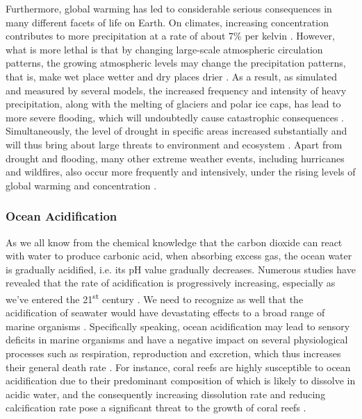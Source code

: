 \documentclass[12pt,a4paper]{article}
\begin{document}
    Furthermore, global warming has led to considerable serious consequences in many different facets of life on Earth. On climates, increasing  concentration contributes to more precipitation at a rate of about $7\%$ per kelvin \autocite{lambert_how_2008,stephens_controls_2008,wentz_how_2007}. However, what is more lethal is that by changing large-scale atmospheric circulation patterns, the growing atmospheric  levels may change the precipitation patterns, that is, make wet place wetter and dry places drier \autocite{national_geographic_society_influence_2023}. As a result, as simulated and measured by several models, the increased frequency and intensity of heavy precipitation, along with the melting of glaciers and polar ice caps, has lead to more severe flooding, which will undoubtedly cause catastrophic consequences \autocite{alfieri_global_2015,alifu_enhancement_2022}. Simultaneously, the level of drought in specific areas increased substantially and will thus bring about large threats to environment and ecosystem \autocite{dai_drought_2011,zeng_increased_2023}. Apart from drought and flooding, many other extreme weather events, including hurricanes and wildfires, also occur more frequently and intensively, under the rising levels of global warming and  concentration \autocite{anthes_hurricanes_2006,moore_quantifying_2015,torn_predicting_1992}.
    \subsubsection{Ocean Acidification}
    As we all know from the chemical knowledge that the carbon dioxide can react with water to produce carbonic acid, when absorbing excess  gas, the ocean water is gradually acidified, i.e. its pH value gradually decreases. Numerous studies have revealed that the rate of acidification is progressively increasing, especially as we've entered the 21\textsuperscript{st} century \autocite{doney_ocean_2009,zeebe_history_2012}. We need to recognize as well that the acidification of seawater would have devastating effects to a broad range of marine organisms \autocite{guinotte_ocean_2008}. Specifically speaking, ocean acidification may lead to sensory deficits in marine organisms and have a negative impact on several physiological processes such as respiration, reproduction and excretion, which thus increases their general death rate \autocite{gazeau_impacts_2013,kroeker_impacts_2013,radford_ocean_2021}. For instance, coral reefs are highly susceptible to ocean acidification due to their predominant composition of  which is likely to dissolve in acidic water, and the consequently increasing dissolution rate and reducing calcification rate pose a significant threat to the growth of coral reefs \autocite{kleypas_coral_2009,silverman_coral_2009}. 
\end{document}
